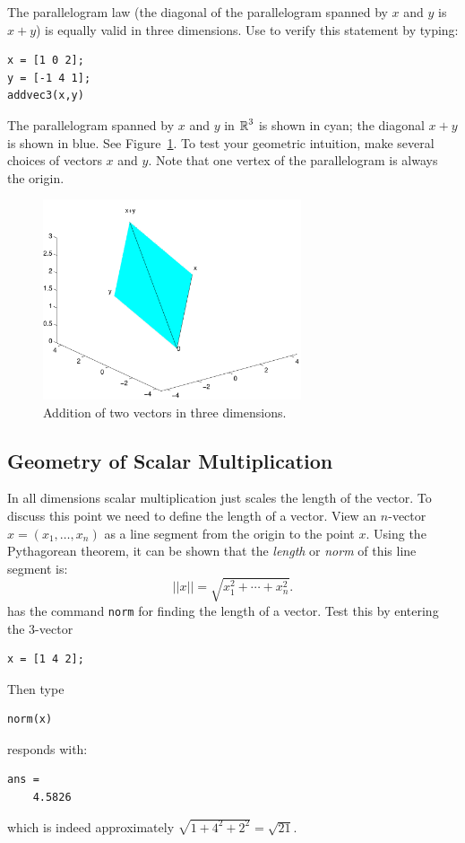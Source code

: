 \documentclass{ximera}
\begin{document}
The parallelogram law (the diagonal of the parallelogram spanned
by $x$ and $y$ is $x+y$) is equally valid in three dimensions.
Use \Matlab to verify this statement by typing:
\begin{verbatim}
x = [1 0 2];
y = [-1 4 1];
addvec3(x,y)
\end{verbatim} 
The parallelogram spanned by $x$ and $y$ in $\mbox{$\mathbb{R}$}^3$ is shown in
cyan; the diagonal $x+y$ is shown in blue.  See Figure~\ref{F:vec3}.   
To test your geometric intuition, make several choices of vectors $x$ and
$y$.  Note that one vertex of the parallelogram is always the
origin.

\begin{figure}[htb]
         \centerline{%
         \includegraphics[width=3.0in]{../figures/vec3.pdf}}
         \caption{Addition of two vectors in three dimensions.}
         \label{F:vec3}
\end{figure}


\subsection*{Geometry of Scalar Multiplication}

In all dimensions scalar multiplication just scales the length of the vector.  To
discuss this point we need to define the length of a vector.
View an $n$-vector $x=(x_1,\ldots,x_n)$ as a line segment from
the origin to the point $x$.  Using the Pythagorean theorem, it can
be shown that the {\em length\/} 
or {\em norm\/} of this line segment is:
\[
||x||  = \sqrt{x_1^2 + \cdots + x_n^2}.
\] \index{\computer:$||\cdot|| $}
\Matlab has the command {\tt norm} for finding the length of a
vector.  Test this by entering the $3$-vector
\begin{verbatim}
x = [1 4 2];
\end{verbatim}
Then type
\begin{verbatim}
norm(x)
\end{verbatim}  
\Matlab responds with:
\begin{verbatim}
ans =
    4.5826
\end{verbatim}
which is indeed approximately $\sqrt{1+4^2+2^2} = \sqrt{21}$.
\end{document}
